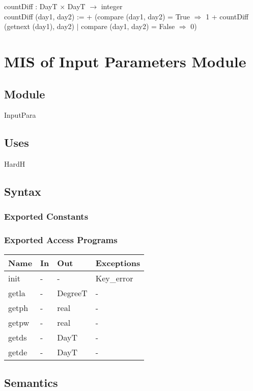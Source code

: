 \documentclass[12pt, titlepage]{article}
\begin{document}
countDiff : DayT $\times$ DayT $\rightarrow $ integer\\
countDiff (day1, day2) := + (compare (day1, day2) = True $\Rightarrow$ 1 + countDiff (getnext (day1), day2) $|$ compare (day1, day2) = False $\Rightarrow$ 0)


\section{MIS of Input Parameters Module} \label{ModuleIP} 

\subsection{Module}
InputPara

\subsection{Uses}
HardH

\subsection{Syntax}

\subsubsection{Exported Constants}


\subsubsection{Exported Access Programs}

\begin{center}
\begin{tabular}{p{2cm} p{4cm} p{4cm} p{2cm}}
\hline
\textbf{Name} & \textbf{In} & \textbf{Out} & \textbf{Exceptions} \\
\hline 
init & - & - & Key\_error \\
getla & - & DegreeT & - \\
getph & - & real & - \\
getpw & - & real & - \\
getds & - & DayT & - \\
getde & - & DayT & - \\


\hline
\end{tabular}
\end{center}


\subsection{Semantics}
\end{document}
